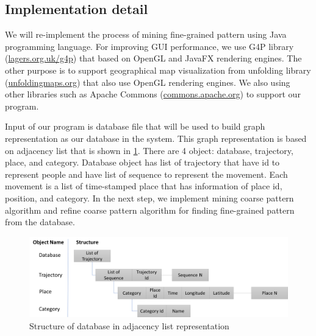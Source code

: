 \documentclass[conference]{IEEEtran}
\begin{document}
\subsection{Implementation detail}
We will re-implement the process of mining fine-grained pattern using Java programming language. For improving GUI performance, we use G4P library (\url{lagers.org.uk/g4p}) that based on OpenGL and JavaFX rendering engines. The other purpose is to support geographical map visualization from unfolding library (\url{unfoldingmaps.org}) that also use OpenGL rendering engines. We also using other libraries such as Apache Commons (\url{commons.apache.org}) to support our program. 
\par 
Input of our program is database file that will be used to build graph representation as our database in the system. This graph representation is based on adjacency list that is shown in \ref{fig:adjacency}. There are 4 object: database, trajectory, place, and category. Database object has list of trajectory that have id to represent people and have list of sequence to represent the movement. Each movement is a list of time-stamped place that has information of place id, position, and category. In the next step, we implement mining coarse pattern algorithm and refine coarse pattern algorithm for finding fine-grained pattern from the database. 
\begin{figure}[!h]
	\centering
	\includegraphics[width=1\linewidth]{adjacency}
	\caption{Structure of database in adjacency list representation}
	\label{fig:adjacency}
\end{figure}
\end{document}
